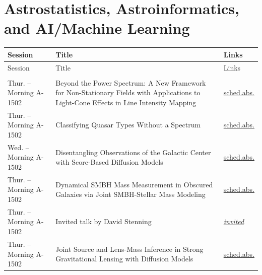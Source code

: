 \section*{Astrostatistics, Astroinformatics, and AI/Machine Learning}
{\small
\setlength{\emergencystretch}{1em}
\begin{longtable}{@{}>{\TableRaggedRight\arraybackslash\hspace{0pt}}p{} >{\TableRaggedRight\arraybackslash\hspace{0pt}}p{} >{\TableRaggedRight\arraybackslash\hspace{0pt}}p{}@{}}
\toprule
Session & Title & Links \\
\midrule
\endfirsthead
\toprule
Session & Title & Links \\
\midrule
\endhead
\addlinespace[0.15em]
\multicolumn{3}{@{}l}{\sffamily\bfseries\color{cascateal} Talks} \\
\addlinespace[0.1em]
Thur. -- Morning A-1502 & Beyond the Power Spectrum: A New Framework for Non-Stationary Fields with Applications to Light-Cone Effects in Line Intensity Mapping & \hyperlink{schedule-talk-251}{sched.}\newline \hyperlink{abstract-talk-251}{abs.} \\
Thur. -- Morning A-1502 & Classifying Quasar Types Without a Spectrum & \hyperlink{schedule-talk-193}{sched.}\newline \hyperlink{abstract-talk-193}{abs.} \\
Wed. -- Morning A-1502 & Disentangling Observations of the Galactic Center with Score-Based Diffusion Models & \hyperlink{schedule-talk-124}{sched.}\newline \hyperlink{abstract-talk-124}{abs.} \\
Thur. -- Morning A-1502 & Dynamical SMBH Mass Measurement in Obscured Galaxies via Joint SMBH-Stellar Mass Modeling & \hyperlink{schedule-talk-330}{sched.}\newline \hyperlink{abstract-talk-330}{abs.} \\
Thur. -- Morning A-1502 & Invited talk by David Stenning & \hyperlink{invited-david-stenning}{\textit{invited}} \\
Thur. -- Morning A-1502 & Joint Source and Lens-Mass Inference in Strong Gravitational Lensing with Diffusion Models & \hyperlink{schedule-talk-317}{sched.}\newline \hyperlink{abstract-talk-317}{abs.} \\

\end{longtable}}
